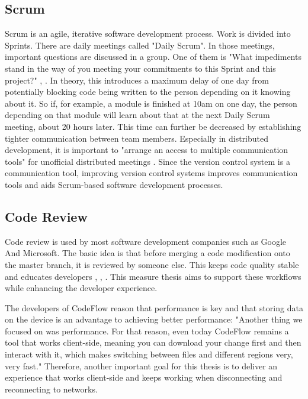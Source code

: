 \subsection{Scrum}
Scrum is an agile, iterative software development process. Work is divided into Sprints. There are daily meetings called "Daily Scrum". In those meetings, important questions are discussed in a group. One of them is "What impediments stand in the way of you meeting your commitments to this Sprint and this project?" \cite{schwaber2004agile}, \cite{10.1007/978-1-4471-0947-1_11}.
In theory, this introduces a maximum delay of one day from potentially blocking code being written to the person depending on it knowing about it.
So if, for example, a module is finished at 10am on one day, the person depending on that module will learn about that at the next Daily Scrum meeting, about 20 hours later. This time can further be decreased by establishing tighter communication between team members.
Especially in distributed development, it is important to "arrange an access to multiple communication tools" \cite{5196933} for unofficial distributed meetings \cite{4638656}.
Since the version control system is a communication tool, improving version control systems improves communication tools and aids Scrum-based software development processes.

\subsection{Code Review}

Code review is used by most software development companies such as Google And Microsoft. The basic idea is that before merging a code modification onto the master branch, it is reviewed by someone else. This keeps code quality stable and educates developers \cite{SadowskiSoederbergChurchSipkoBacchelli:2018:Moderncodereview:acasestudyatgoogle}, \cite{Bacchelli:2013:EOC:2486788.2486882}, \cite{7081824}. This measure thesis aims to support these workflows while enhancing the developer experience. 

The developers of CodeFlow reason that performance is key and that storing data on the device is an advantage to achieving better performance: "Another thing we focused on was performance. For that
reason, even today CodeFlow remains a tool that works
client-side, meaning you can download your change first
and then interact with it, which makes switching between
files and different regions very, very fast." \cite{CzerwonkaGreilerBirdPanjerCoatta:2018:CodeFlow:ImprovingtheCodeReviewProcessatMicrosoft} Therefore, another important goal for this thesis is to deliver an experience that works client-side and keeps working when disconnecting and reconnecting to networks.
